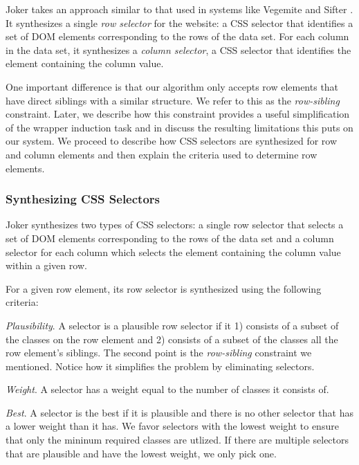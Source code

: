 \documentclass[sigconf,10pt]{acmart}
\begin{document}
Joker takes an approach similar to that used in systems like Vegemite
\citep{lin2009} and Sifter \citep{huynh2006}. It synthesizes a single
\emph{row selector} for the website: a CSS selector that identifies a
set of DOM elements corresponding to the rows of the data set. For each
column in the data set, it synthesizes a \emph{column selector}, a CSS
selector that identifies the element containing the column value.

One important difference is that our algorithm only accepts row elements
that have direct siblings with a similar structure. We refer to this as
the \emph{row-sibling} constraint. Later, we describe how this
constraint provides a useful simplification of the wrapper induction
task and in \citep{section:evaluation} discuss the resulting limitations
this puts on our system. We proceed to describe how CSS selectors are
synthesized for row and column elements and then explain the criteria
used to determine row elements.

\hypertarget{synthesizing-css-selectors}{%
\subsubsection{Synthesizing CSS
Selectors}\label{synthesizing-css-selectors}}

Joker synthesizes two types of CSS selectors: a single row selector that
selects a set of DOM elements corresponding to the rows of the data set
and a column selector for each column which selects the element
containing the column value within a given row.

For a given row element, its row selector is synthesized using the
following criteria:

\emph{Plausibility}. A selector is a plausible row selector if it 1)
consists of a subset of the classes on the row element and 2) consists
of a subset of the classes all the row element's siblings. The second
point is the \emph{row-sibling} constraint we mentioned. Notice how it
simplifies the problem by eliminating selectors.

\emph{Weight}. A selector has a weight equal to the number of classes it
consists of.

\emph{Best}. A selector is the best if it is plausible and there is no
other selector that has a lower weight than it has. We favor selectors
with the lowest weight to ensure that only the mininum required classes
are utlized. If there are multiple selectors that are plausible and have
the lowest weight, we only pick one.
\end{document}
